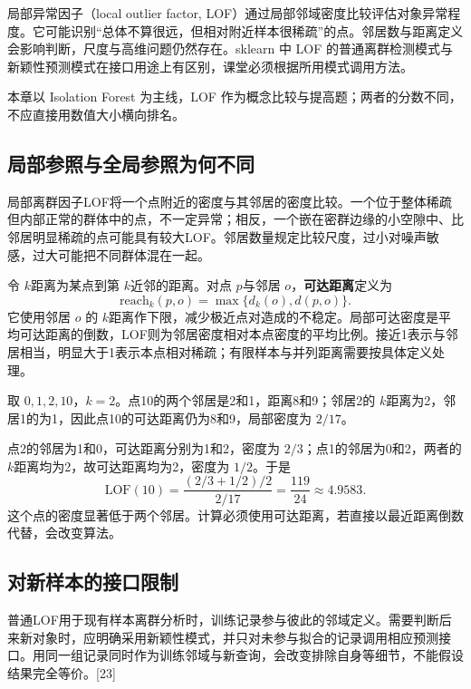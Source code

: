 局部异常因子（local outlier factor, LOF）通过局部邻域密度比较评估对象异常程度。它可能识别“总体不算很远，但相对附近样本很稀疏”的点。邻居数与距离定义会影响判断，尺度与高维问题仍然存在。sklearn 中 LOF 的普通离群检测模式与新颖性预测模式在接口用途上有区别，课堂必须根据所用模式调用方法。

本章以 Isolation Forest 为主线，LOF 作为概念比较与提高题；两者的分数不同，不应直接用数值大小横向排名。

\subsection{局部参照与全局参照为何不同}
局部离群因子LOF将一个点附近的密度与其邻居的密度比较。一个位于整体稀疏但内部正常的群体中的点，不一定异常；相反，一个嵌在密群边缘的小空隙中、比邻居明显稀疏的点可能具有较大LOF。邻居数量规定比较尺度，过小对噪声敏感，过大可能把不同群体混在一起。

令 $k$距离为某点到第 $k$近邻的距离。对点 $p$与邻居 $o$，\textbf{可达距离}定义为
\[
\mathrm{reach}_k(p,o)=\max\{d_k(o),d(p,o)\}.
\]
它使用邻居 $o$ 的 $k$距离作下限，减少极近点对造成的不稳定。局部可达密度是平均可达距离的倒数，LOF则为邻居密度相对本点密度的平均比例。接近1表示与邻居相当，明显大于1表示本点相对稀疏；有限样本与并列距离需要按具体定义处理。

取 $0,1,2,10$，$k=2$。点10的两个邻居是2和1，距离8和9；邻居2的 $k$距离为2，邻居1的为1，因此点10的可达距离仍为8和9，局部密度为 $2/17$。

点2的邻居为1和0，可达距离分别为1和2，密度为 $2/3$；点1的邻居为0和2，两者的 $k$距离均为2，故可达距离均为2，密度为 $1/2$。于是
\[
\mathrm{LOF}(10)=\frac{(2/3+1/2)/2}{2/17}=\frac{119}{24}\approx4.9583.
\]
这个点的密度显著低于两个邻居。计算必须使用可达距离，若直接以最近距离倒数代替，会改变算法。

\subsection{对新样本的接口限制}
普通LOF用于现有样本离群分析时，训练记录参与彼此的邻域定义。需要判断后来新对象时，应明确采用新颖性模式，并只对未参与拟合的记录调用相应预测接口。用同一组记录同时作为训练邻域与新查询，会改变排除自身等细节，不能假设结果完全等价。[23]


